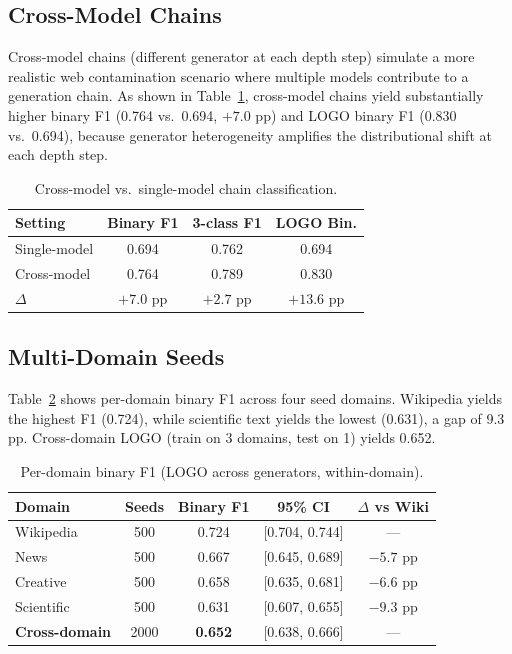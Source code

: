\documentclass[11pt]{article}
\begin{document}
\subsection{Cross-Model Chains}
\label{sec:cross_model}

Cross-model chains (different generator at each depth step) simulate a more realistic web contamination scenario where multiple models contribute to a generation chain. As shown in Table~\ref{tab:cross_model}, cross-model chains yield substantially higher binary F1 (0.764 vs.\ 0.694, $+7.0$ pp) and LOGO binary F1 (0.830 vs.\ 0.694), because generator heterogeneity amplifies the distributional shift at each depth step.

\begin{table}[t]
\centering
\small
\caption{Cross-model vs.\ single-model chain classification.}
\label{tab:cross_model}
\begin{tabular}{lccc}
\toprule
\textbf{Setting} & \textbf{Binary F1} & \textbf{3-class F1} & \textbf{LOGO Bin.} \\
\midrule
Single-model & 0.694 & 0.762 & 0.694 \\
Cross-model & 0.764 & 0.789 & 0.830 \\
$\Delta$ & $+7.0$ pp & $+2.7$ pp & $+13.6$ pp \\
\bottomrule
\end{tabular}
\end{table}

\subsection{Multi-Domain Seeds}
\label{sec:domain}

Table~\ref{tab:domain} shows per-domain binary F1 across four seed domains. Wikipedia yields the highest F1 (0.724), while scientific text yields the lowest (0.631), a gap of 9.3 pp. Cross-domain LOGO (train on 3 domains, test on 1) yields 0.652.

\begin{table}[t]
\centering
\small
\caption{Per-domain binary F1 (LOGO across generators, within-domain).}
\label{tab:domain}
\begin{tabular}{lcccc}
\toprule
\textbf{Domain} & \textbf{Seeds} & \textbf{Binary F1} & \textbf{95\% CI} & \textbf{$\Delta$ vs Wiki} \\
\midrule
Wikipedia & 500 & 0.724 & [0.704, 0.744] & --- \\
News & 500 & 0.667 & [0.645, 0.689] & $-5.7$ pp \\
Creative & 500 & 0.658 & [0.635, 0.681] & $-6.6$ pp \\
Scientific & 500 & 0.631 & [0.607, 0.655] & $-9.3$ pp \\
\midrule
\textbf{Cross-domain} & 2000 & \textbf{0.652} & [0.638, 0.666] & --- \\
\bottomrule
\end{tabular}
\end{table}
\end{document}

